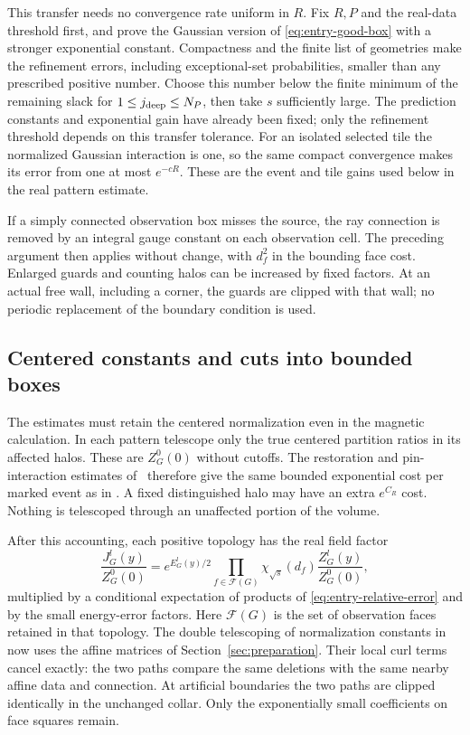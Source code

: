 This transfer needs no convergence rate uniform in $R$. Fix $R,P$
and the real-data threshold first, and prove the Gaussian version
of \eqref{eq:entry-good-box} with a stronger exponential constant.
Compactness and the finite list of geometries make the refinement
errors, including exceptional-set probabilities, smaller than any
prescribed positive number. Choose this number below the finite
minimum of the remaining slack for $1\le j_{\rm deep}\le N_P$,
then take $s$ sufficiently large. The prediction constants and
exponential gain have already been fixed; only the refinement
threshold depends on this transfer tolerance. For an isolated
selected tile the normalized Gaussian interaction is one, so the
same compact convergence makes its error from one at most
$e^{-cR}$. These are the event and tile gains used below in the
real pattern estimate.

If a simply connected observation box misses the source, the ray
connection is removed by an integral gauge constant on each
observation cell. The preceding argument then applies without change,
with $d_f^2$ in the bounding face cost. Enlarged guards and counting
halos can be increased by fixed factors. At an actual free wall,
including a corner, the guards are clipped with that wall; no periodic
replacement of the boundary condition is used.

\subsection{Centered constants and cuts into bounded boxes}

The estimates must retain the centered normalization even in the
magnetic calculation. In each pattern telescope only the true centered
partition ratios in its affected halos. These are $Z_G^0(0)$ without
cutoffs. The restoration and pin-interaction estimates of~\cite{X}
therefore give the same bounded exponential cost per marked event as in
\cite[Equations (5.16) and
(5.17)]{X}. A fixed distinguished halo may have an extra
$e^{C_R}$ cost. Nothing is telescoped through an unaffected portion of
the volume.

After this accounting, each positive topology has the real field
factor
\begin{equation}\label{eq:entry-topology-factor}
       \frac{J_G^l(y)}{Z_G^0(0)}
       =e^{E_G^l(y)/2}
          \prod_{f\in\mathcal F(G)}\chi_{\sqrt{s}}(d_f)
                         \frac{Z_G^l(y)}{Z_G^0(0)},
\end{equation}
multiplied by a conditional expectation of products of
\eqref{eq:entry-relative-error} and by the small energy-error factors.
Here $\mathcal F(G)$ is the set of observation faces retained in that topology.
The double telescoping of normalization constants in
\cite[Lemma 9.3]{B} now uses the affine matrices
of Section~\ref{sec:preparation}. Their local curl terms cancel
exactly: the two paths compare the same deletions with the same
nearby affine data and connection. At artificial boundaries the two
paths are clipped identically in the unchanged collar. Only the
exponentially small coefficients on face squares remain.

